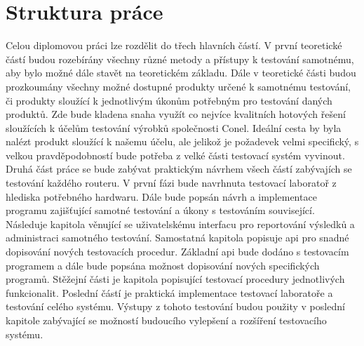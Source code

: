 \section{Struktura práce}
Celou diplomovou práci lze rozdělit do třech hlavních částí. V první teoretické částí budou rozebírány všechny různé metody a přístupy k testování samotnému, aby bylo možné dále stavět na teoretickém základu. Dále v teoretické části budou prozkoumány všechny možné dostupné produkty určené k samotnému testování, či produkty sloužící k jednotlivým úkonům potřebným pro testování daných produktů. Zde bude kladena snaha využít co nejvíce kvalitních hotových řešení sloužících k účelům testování výrobků společnosti Conel. Ideální cesta by byla nalézt produkt sloužící k našemu účelu, ale jelikož je požadevek velmi specifický, s velkou pravděpodobností bude potřeba z velké části testovací systém vyvinout. Druhá část práce se bude zabývat praktickým návrhem všech částí zabývajích se testování každého routeru. V první fázi bude navrhnuta testovací laboratoř z hlediska potřebného hardwaru. Dále bude popsán návrh a implementace programu zajišťující samotné testování a úkony s testováním související. Následuje kapitola věnující se uživatelskému interfacu pro reportování výsledků a administraci samotného testování. Samostatná kapitola popisuje api pro snadné dopisování nových testovacích procedur. Základní api bude dodáno s testovacím programem a dále bude popsána možnost dopisování nových specifických programů. Stěžejní části je kapitola popisující testovací procedury jednotlivých funkcionalit. Poslední částí je praktická implementace testovací laboratoře a testování celého systému. Výstupy z tohoto testování budou použity v poslední kapitole zabývající se možností budoucího vylepšení a rozšíření testovacího systému.

\endinput
